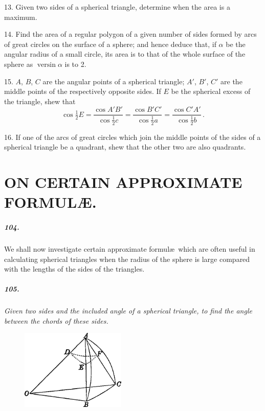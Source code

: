 \documentclass{book}[2004/02/16]
\begin{document}
\begin{mainmatter}
\begin{spacing}{1.3}
13. Given two sides of a spherical triangle, determine when
the area is a maximum.
\medskip

14. Find the area of a regular polygon of a given number of
sides formed by arcs of great circles on the surface of a sphere;
and hence deduce that, if $\alpha$ be the angular radius of a small
circle, its area is to that of the whole surface of the sphere as
$\operatorname{versin}\alpha$ is to 2.
\medskip

15. $A$, $B$, $C$ are the angular points of a spherical triangle;
$A'$, $B'$, $C'$ are the middle points of the respectively opposite sides.
If $E$ be the spherical excess of the triangle, shew that
\[
  \cos\tfrac{1}{2}E
= \frac{\cos A'B'}{\cos \frac{1}{2}c}
= \frac{\cos B'C'}{\cos \frac{1}{2}a}
= \frac{\cos C'A'}{\cos \frac{1}{2}b}\,.
\]

16. If one of the arcs of great circles which join the middle
points of the sides of a spherical triangle be a quadrant, shew that
the other two are also quadrants.

\chapter[On certain approximate Formul\ae.]{ON CERTAIN APPROXIMATE FORMUL\AE.}

\paragraph{104.} We shall now investigate certain approximate formul\ae\
which are often useful in calculating spherical triangles when the
radius of the sphere is large compared with the lengths of the
sides of the triangles.

\paragraph{105.} \textit{Given two sides and the included angle of a spherical
triangle, to find the angle between the chords of these sides.}
\begin{figure}[htp]
\centering
\includegraphics[width=5.0cm]{images/085fc}
\end{figure}


\end{spacing}
\end{mainmatter}
\end{document}
